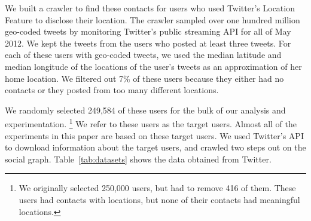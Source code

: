 \documentclass[letterpaper]{article}
\begin{document}
We built a crawler to find these contacts for users who used Twitter's Location
Feature to disclose their location.
%
The crawler sampled over one hundred million geo-coded tweets by monitoring
Twitter's public streaming API for all of May 2012.
We kept the tweets from the users who posted at least three tweets.
%
For each of these users with geo-coded tweets, we used the median latitude and
median longitude of the locations of the user's tweets as an approximation of
her home location.
%
We filtered out 7\% of these users because they either had no contacts or they
posted from too many different locations.

%

We randomly selected 249,584 of these users for the bulk of our analysis and
experimentation.
\ifdefined\THESIS
\footnote{We originally selected 250,000 users, but had to remove 416 of them.
These users had contacts with locations, but none of their contacts had
meaningful locations.}
\fi
%
We refer to these users as the target users.
%
Almost all of the experiments in this paper are based on these target
users.
%
We used Twitter's API to download information about the target users, and
crawled two steps out on the social graph.
%
Table~\ref{tab:datasets} shows the data obtained from Twitter.

\end{document}
